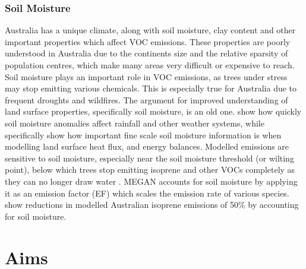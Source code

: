     \subsubsection{Soil Moisture}
      \label{LR:Models:Unc:SoilMoisture}
      Australia has a unique climate, along with soil moisture, clay content and other important properties which affect VOC emissions.
      These properties are poorly understood in Australia due to the continents size and the relative sparsity of population centres, which make many areas very difficult or expensive to reach.
      Soil moisture plays an important role in VOC emissions, as trees under stress may stop emitting various chemicals. 
      This is especially true for Australia due to frequent droughts and wildfires.
      The argument for improved understanding of land surface properties, specifically soil moisture, is an old one\citep{Mintz1982, Rowntree1983, Chen2001}. 
      \cite{Rowntree1983} show how quickly soil moisture anomalies affect rainfall and other weather systems, while \cite{Chen2001} specifically show how important fine scale soil moisture information is when modelling land surface heat flux, and energy balances.
      Modelled emissions are sensitive to soil moisture, especially near the soil moisture threshold (or wilting point), below which trees stop emitting isoprene and other VOCs completely as they can no longer draw water \citep{Bauwens2016}.
      MEGAN accounts for soil moisture by applying it as an emission factor (EF) which scales the emission rate of various species.
      \citet{Sindelarova2014} show reductions in modelled Australian isoprene emissions of 50\% by accounting for soil moisture. 

\section{Aims}
  \label{LR:Aims}